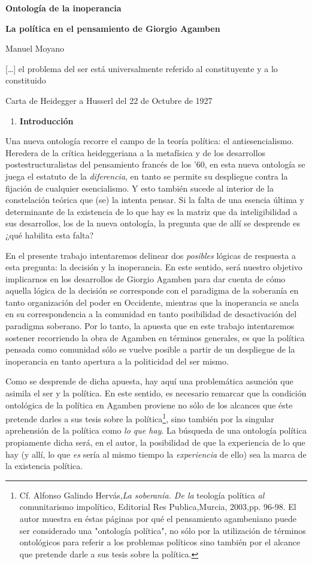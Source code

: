 \documentclass{book}
\begin{document}
\textbf{Ontología de la inoperancia}

\textbf{La política en el pensamiento de Giorgio Agamben}

Manuel Moyano

{[}\ldots{]} el problema del ser está universalmente referido al
constituyente y a lo constituido

Carta de Heidegger a Husserl del 22 de Octubre de 1927

\begin{enumerate}
\def\labelenumi{\arabic{enumi}.}
\item
  \textbf{Introducción}
\end{enumerate}

Una nueva ontología recorre el campo de la teoría política: el
antiesencialismo. Heredera de la crítica heideggeriana a la metafísica y
de los desarrollos postestructuralistas del pensamiento francés de los
'60, en esta nueva ontología se juega el estatuto de la
\emph{diferencia}, en tanto se permite su despliegue contra la fijación
de cualquier esencialismo. Y esto también sucede al interior de la
constelación teórica que (se) la intenta pensar. Si la falta de una
esencia última y determinante de la existencia de lo que hay es la
matriz que da inteligibilidad a sus desarrollos, los de la nueva
ontología, la pregunta que de allí se desprende es ¿qué habilita esta
falta?

En el presente trabajo intentaremos delinear dos \emph{posibles} lógicas
de respuesta a esta pregunta: la decisión y la inoperancia. En este
sentido, será nuestro objetivo implicarnos en los desarrollos de Giorgio
Agamben para dar cuenta de cómo aquella lógica de la decisión se
corresponde con el paradigma de la soberanía en tanto organización del
poder en Occidente, mientras que la inoperancia se ancla en su
correspondencia a la comunidad en tanto posibilidad de desactivación del
paradigma soberano. Por lo tanto, la apuesta que en este trabajo
intentaremos sostener recorriendo la obra de Agamben en términos
generales, es que la política pensada como comunidad sólo se vuelve
posible a partir de un despliegue de la inoperancia en tanto apertura a
la politicidad del ser mismo.

Como se desprende de dicha apuesta, hay aquí una problemática asunción
que asimila el ser y la política. En este sentido, es necesario remarcar
que la condición ontológica de la política en Agamben proviene no sólo
de los alcances que éste pretende darles a sus tesis sobre la
política\footnote{Cf. Alfonso Galindo Hervás,\emph{La soberanía. De la}
  teología política \emph{al} comunitarismo impolítico, Editorial Res
  Publica,Murcia, 2003,pp. 96-98. El autor muestra en éstas páginas por
  qué el pensamiento agambeniano puede ser considerado una "ontología
  política", no sólo por la utilización de términos ontológicos para
  referir a los problemas políticos sino también por el alcance que
  pretende darle a sus tesis sobre la política.}, sino también por la
singular aprehensión de la política como \emph{lo que hay}. La búsqueda
de una ontología política propiamente dicha será, en el autor, la
posibilidad de que la experiencia de lo que hay (y allí, lo que
\emph{es} sería al mismo tiempo la \emph{experiencia} de ello) sea la
marca de la existencia política.
\end{document}
